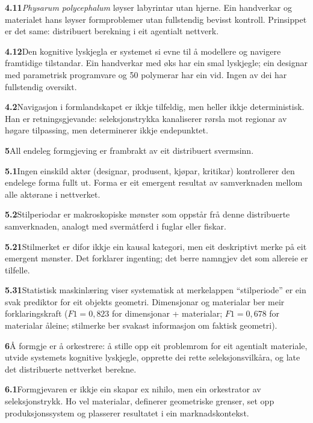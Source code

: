 \documentclass[10pt, a4paper, twocolumn]{article}
\begin{document}
\medskip
\noindent\textbf{4.11}\quad \textit{Physarum polycephalum} løyser labyrintar utan hjerne. Ein handverkar og materialet hans løyser formproblemer utan fullstendig bevisst kontroll. Prinsippet er det same: distribuert berekning i eit agentialt nettverk.

\medskip
\noindent\textbf{4.12}\quad Den kognitive lyskjegla \citep{levin2019} er systemet si evne til å modellere og navigere framtidige tilstandar. Ein handverkar med øks har ein smal lyskjegle; ein designar med parametrisk programvare og 50 polymerar har ein vid. Ingen av dei har fullstendig oversikt.

\medskip
\noindent\textbf{4.2}\quad Navigasjon i formlandskapet er ikkje tilfeldig, men heller ikkje deterministisk. Han er retningsgjevande: seleksjonstrykka kanaliserer rørsla mot regionar av høgare tilpassing, men determinerer ikkje endepunktet.

\bigskip

\noindent\textbf{5}\quad All endeleg formgjeving er frambrakt av eit distribuert svermsinn.

\medskip
\noindent\textbf{5.1}\quad Ingen einskild aktør (designar, produsent, kjøpar, kritikar) kontrollerer den endelege forma fullt ut. Forma er eit emergent resultat av samverknaden mellom alle aktørane i nettverket.

\medskip
\noindent\textbf{5.2}\quad Stilperiodar er makroskopiske mønster som oppstår frå denne distribuerte samverknaden, analogt med svermåtferd i fuglar eller fiskar.

\medskip
\noindent\textbf{5.21}\quad Stilmerket er difor ikkje ein kausal kategori, men eit deskriptivt merke på eit emergent mønster. Det forklarer ingenting; det berre namngjev det som allereie er tilfelle.

\medskip
\noindent\textbf{5.31}\quad Statistisk maskinlæring viser systematisk at merkelappen ``stilperiode'' er ein svak prediktor for eit objekts geometri. Dimensjonar og materialar ber meir forklaringskraft ($F1 = 0{,}823$ for dimensjonar + materialar; $F1 = 0{,}678$ for materialar åleine; stilmerke ber svakast informasjon om faktisk geometri).

\bigskip

\noindent\textbf{6}\quad Å formgje er å orkestrere: å stille opp eit problemrom for eit agentialt materiale, utvide systemets kognitive lyskjegle, opprette dei rette seleksjonsvilkåra, og late det distribuerte nettverket berekne.

\medskip
\noindent\textbf{6.1}\quad Formgjevaren er ikkje ein skapar ex nihilo, men ein orkestrator av seleksjonstrykk. Ho vel materialar, definerer geometriske grenser, set opp produksjonssystem og plasserer resultatet i ein marknadskontekst.
\end{document}
